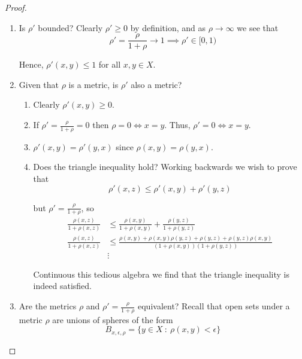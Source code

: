\documentclass[12pt]{article}
\begin{document}
\begin{proof} \hfill\\
\begin{enumerate}
	\item Is $\rho'$ bounded? Clearly $\rho' \geq 0$ by definition, and as $\rho \to \infty$ we see that
	\begin{equation*}
		\rho' = \frac{\rho}{1 + \rho} \to 1 \implies \rho' \in [0, 1)
	\end{equation*}
	
	Hence, $\rho'(x, y) \leq 1$ for all $x,y \in X$.
	
	\item Given that $\rho$ is a metric, is $\rho'$ also a metric?
	\begin{enumerate}
		\item Clearly $\rho'(x,y) \geq 0$.
		
		\item If $\rho' = \frac{\rho}{1 + \rho} = 0$ then $\rho = 0 \iff x = y$. Thus,
		$\rho' = 0 \iff x = y$.
		
		\item $\rho'(x,y) = \rho'(y,x)$ since $\rho(x,y) = \rho(y, x)$. \\

		\item Does the triangle inequality hold? Working backwards we wish to prove that
		\begin{equation*}
			\rho'(x,z) \leq \rho'(x,y) + \rho'(y,z) 
		\end{equation*}
		
		but $\rho' = \frac{\rho}{1 + \rho}$, so
		\begin{align*}
			\frac{\rho(x,z)}{1 + \rho(x,z)} &\leq \frac{\rho(x,y)}{1 + \rho(x,y)} + \frac{\rho(y,z)}{1 + \rho(y,z)} \\
			\frac{\rho(x,z)}{1 + \rho(x,z)} &\leq \frac{ \rho(x,y) + \rho(x,y)\rho(y,z) + \rho(y,z) + \rho(y,z)\rho(x,y) }{ (1 + \rho(x,y))(1 + \rho(y,z)) } \\
			&\vdots
		\end{align*}
		
		Continuous this tedious algebra we find that the triangle inequality is indeed satisfied.
	\end{enumerate}
	
	\item Are the metrics $\rho$ and $\rho' = \frac{\rho}{1 + \rho}$ equivalent? Recall that open sets under a metric $\rho$ are unions of spheres of the form
	\begin{equation*}
		B_{x,\epsilon,\rho} = \{y\in X ~:~ \rho(x,y) < \epsilon\}
	\end{equation*}
	

\end{enumerate}
\end{proof}
\end{document}
